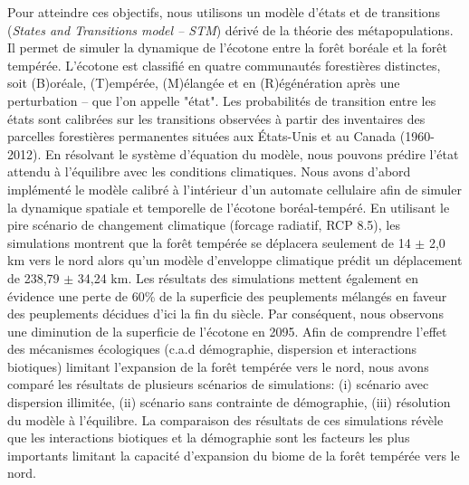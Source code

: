 Pour atteindre ces objectifs, nous utilisons un modèle d'états et de transitions (\textit{States and
Transitions model -- STM}) dérivé de la théorie des métapopulations. Il permet de simuler la
dynamique de l'écotone entre la forêt boréale et la forêt tempérée. L'écotone est classifié en
quatre communautés forestières distinctes, soit (B)oréale, (T)empérée, (M)élangée et en
(R)égénération après une perturbation -- que l'on appelle "état". Les probabilités de transition
entre les états sont calibrées sur les transitions observées à partir des inventaires des parcelles
forestières permanentes situées aux États-Unis et au Canada (1960-2012). En résolvant le système
d'équation du modèle, nous pouvons prédire l'état attendu à l'équilibre avec les conditions
climatiques. Nous avons d'abord implémenté le modèle calibré à l'intérieur d'un automate cellulaire
afin de simuler la dynamique spatiale et temporelle de l'écotone boréal-tempéré. En utilisant le
pire scénario de changement climatique (forcage radiatif, RCP 8.5), les simulations montrent que la
forêt tempérée se déplacera seulement de 14 $\pm$ 2,0 km vers le nord alors qu'un modèle d'enveloppe
climatique prédit un déplacement de 238,79 $\pm$ 34,24 km. Les résultats des simulations mettent
également en évidence une perte de 60\% de la superficie des peuplements mélangés en faveur des
peuplements décidues d’ici la fin du siècle. Par conséquent, nous observons une diminution de la
superficie de l'écotone en 2095. Afin de comprendre l'effet des mécanismes écologiques (c.a.d
démographie, dispersion et interactions biotiques) limitant l'expansion de la forêt tempérée vers le
nord, nous avons comparé les résultats de plusieurs scénarios de simulations: (i) scénario avec
dispersion illimitée, (ii) scénario sans contrainte de démographie, (iii) résolution du modèle à
l'équilibre. La comparaison des résultats de ces simulations révèle que les interactions biotiques
et la démographie sont les facteurs les plus importants limitant la capacité d'expansion du biome de
la forêt tempérée vers le nord.



